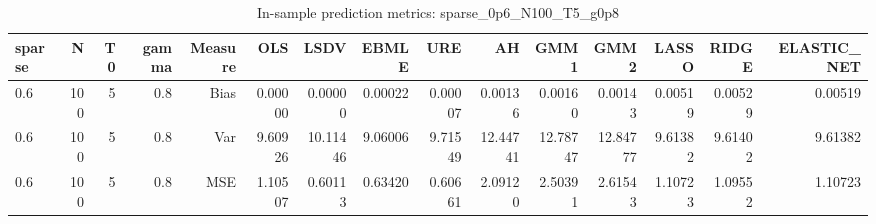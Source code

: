\begin{table}[!htbp]\centering
\caption{In-sample prediction metrics: sparse_0p6_N100_T5_g0p8}
\label{tab:table2_sparse_0p6_N100_T5_g0p8}
\begin{tabular}{lrrrrrrrrrrrrrr}
\hline
sparse & N & T0 & gamma & Measure & OLS & LSDV & EBMLE & URE & AH & GMM1 & GMM2 & LASSO & RIDGE & ELASTIC_NET \\
\hline
0.6 & 100 & 5 & 0.8 & Bias & 0.00000 & 0.00000 & 0.00022 & 0.00007 & 0.00136 & 0.00160 & 0.00143 & 0.00519 & 0.00529 & 0.00519 \\
0.6 & 100 & 5 & 0.8 & Var & 9.60926 & 10.11446 & 9.06006 & 9.71549 & 12.44741 & 12.78747 & 12.84777 & 9.61382 & 9.61402 & 9.61382 \\
0.6 & 100 & 5 & 0.8 & MSE & 1.10507 & 0.60113 & 0.63420 & 0.60661 & 2.09120 & 2.50391 & 2.61543 & 1.10723 & 1.09552 & 1.10723 \\
\hline
\end{tabular}
\end{table}

